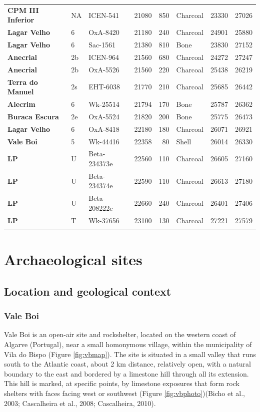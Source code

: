 \documentclass[12pt,twoside]{reedthesis}
\begin{document}
\begin{landscape}
\begin{longtable}[t]{>{\bfseries}lllrrlrr}
CPM III Inferior & NA & ICEN-541 & 21080 & 850 & Charcoal & 23330 & 27026\\
Lagar Velho & 6 & OxA-8420 & 21180 & 240 & Charcoal & 24901 & 25880\\
Lagar Velho & 6 & Sac-1561 & 21380 & 810 & Bone & 23830 & 27152\\
\addlinespace
Anecrial & 2b & ICEN-964 & 21560 & 680 & Charcoal & 24272 & 27247\\
Anecrial & 2b & OxA-5526 & 21560 & 220 & Charcoal & 25438 & 26219\\
Terra do Manuel & 2s & EHT-6038 & 21770 & 210 & Charcoal & 25685 & 26442\\
Alecrim & 6 & Wk-25514 & 21794 & 170 & Bone & 25787 & 26362\\
Buraca Escura & 2e & OxA-5524 & 21820 & 200 & Bone & 25775 & 26473\\
\addlinespace
Lagar Velho & 6 & OxA-8418 & 22180 & 180 & Charcoal & 26071 & 26921\\
Vale Boi & 5 & Wk-44416 & 22358 & 80 & Shell & 26014 & 26330\\
LP & U & Beta-234373e & 22560 & 110 & Charcoal & 26605 & 27160\\
LP & U & Beta-234374e & 22590 & 110 & Charcoal & 26613 & 27180\\
LP & U & Beta-208222e & 22660 & 240 & Charcoal & 26401 & 27406\\
\addlinespace
LP & T & Wk-37656 & 23100 & 130 & Charcoal & 27221 & 27579\\*
\end{longtable}
\endgroup{}
\end{landscape}
\hypertarget{archaeological-sites}{%
\chapter{Archaeological sites}\label{archaeological-sites}}

\hypertarget{location-and-geological-context}{%
\section{Location and geological context}\label{location-and-geological-context}}

\hypertarget{vale-boi}{%
\subsection{Vale Boi}\label{vale-boi}}

Vale Boi is an open-air site and rockshelter, located on the western coast of Algarve (Portugal), near a small homonymous village, within the municipality of Vila do Bispo (Figure \ref{fig:vbmap}). The site is situated in a small valley that runs south to the Atlantic coast, about 2 km distance, relatively open, with a natural boundary to the east and bordered by a limestone hill through all its extension. This hill is marked, at specific points, by limestone exposures that form rock shelters with faces facing west or southwest (Figure \ref{fig:vbphoto})(Bicho et al., 2003; Cascalheira et al., 2008; Cascalheira, 2010).
\end{document}

